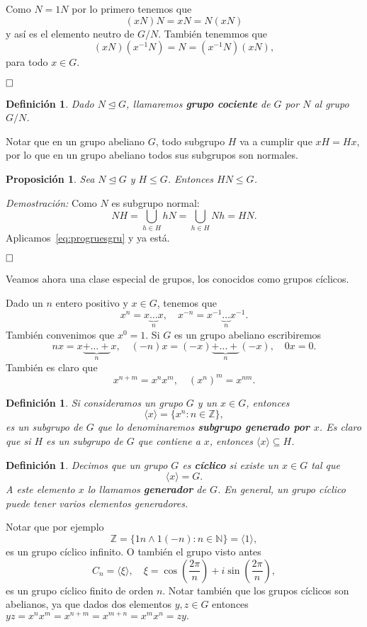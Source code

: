 \documentclass[12pt]{article}
\newtheorem{proposition}[theorem]{Proposición}
\newtheorem{definition}[theorem]{Definición}
\begin{document}
Como $N = 1N$ por lo primero tenemos que $$(xN)N=xN = N(xN)$$ y así es el elemento neutro de $G/N$. También tenemmos que $$(xN)(x^{-1}N) = N = (x^{-1}N)(xN),$$ para todo $x	\in G$.

$\hfill \square$

\begin{definition}Dado $N \unlhd G$, llamaremos \textbf{grupo cociente} de $G$ por $N$ al grupo $G/N$.
\end{definition}

Notar que en un grupo abeliano $G$, todo subgrupo $H$ va a cumplir que $xH = Hx$, por lo que en un grupo abeliano todos sus subgrupos son normales.

\begin{proposition}Sea $N \unlhd G$ y $H \leq G$. Entonces $HN \leq G$.
\end{proposition}
\emph{Demostración: }Como $N$ es subgrupo normal: $$NH = \bigcup_{h\in H} hN = \bigcup_{h\in H} Nh = HN.$$ Aplicamos~\ref{eq:progruesgru} y ya está.

$\hfill \square$

Veamos ahora una clase especial de grupos, los conocidos como grupos cíclicos. 

Dado un $n$ entero positivo y $x\in G$, tenemos que $$x^n = x\underbrace{\ldots}_{n} x, \quad x^{-n} = x^{-1} \underbrace{\ldots}_n x^{-1}.$$ También convenimos que $x^0 = 1$. Si $G$ es un grupo abeliano escribiremos $$nx = x\underbrace{+\ldots +}_n x, \quad (-n)x=(-x)\underbrace{+\ldots +}_n(-x), \quad 0x = 0.$$ También es claro que $$x^{n+m} = x^nx^m, \quad (x^n)^m=x^{nm}.$$

\begin{definition}Si consideramos un grupo $G$ y un $x\in G$, entonces $$\langle x \rangle = \lbrace x^n:n \in \mathbb{Z} \rbrace,$$ es un subgrupo de $G$ que lo denominaremos \textbf{subgrupo generado por $x$}. Es claro que si $H$ es un subgrupo de $G$ que contiene a $x$, entonces $\langle x \rangle \subseteq H$.
\end{definition}

\begin{definition}Decimos que un grupo $G$ es \textbf{cíclico} si existe un $x \in G$ tal que $$\langle x \rangle = G.$$ A este elemento $x$ lo llamamos \textbf{generador} de $G$. En general, un grupo cíclico puede tener varios elementos generadores.
\end{definition}

Notar que por ejemplo $$\mathbb{Z} = \lbrace 1n \wedge 1(-n) :n \in \mathbb{N} \rbrace= \langle 1 \rangle,$$ es un grupo cíclico infinito. O también el grupo visto antes $$C_n = \langle \xi \rangle, \quad \xi = \cos\left(\dfrac{2\pi}{n}\right)+i\sin\left(\dfrac{2\pi}{n}\right),$$ es un grupo cíclico finito de orden $n$. Notar también que los grupos cíclicos son abelianos, ya que dados dos elementos $y,z \in G$ entonces $yz = x^nx^m=x^{n+m}=x^{m+n} = x^mx^n=zy.$
\end{document}
